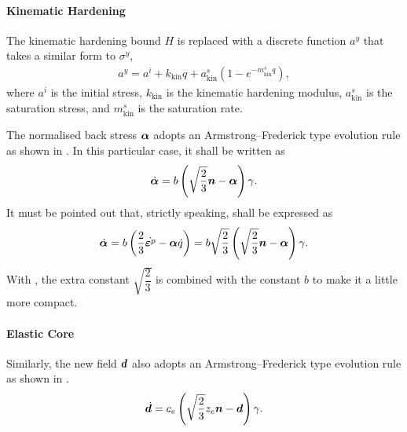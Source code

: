 \paragraph{Kinematic Hardening}
The kinematic hardening bound $H$ is replaced with a discrete function $a^y$ that takes a similar form to $\sigma^y$,
\begin{gather}\label{eq:kin_bone}
    a^y=a^i+k_\text{kin}q+a^s_\text{kin}\left(1-e^{-m^s_\text{kin}q}\right),
\end{gather}
where $a^i$ is the initial stress, $k_\text{kin}$ is the kinematic hardening modulus, $a^s_\text{kin}$ is the saturation stress, and $m^s_\text{kin}$ is the saturation rate.

The normalised back stress $\bm{\alpha}$ adopts an Armstrong--Frederick type \cite{Frederick2007} evolution rule as shown in .
In this particular case, it shall be written as
\begin{gather}\label{eq:normalised_back_rule}
    \dot{\bm{\alpha}}=b\left(\sqrt{\dfrac{2}{3}}\bm{n}-\bm{\alpha}\right)\gamma.
\end{gather}
It must be pointed out that, strictly speaking,  shall be expressed as \cite{Simo1998}
\begin{gather}
    \dot{\bm{\alpha}}=b\left(\dfrac{2}{3}\dot{\bm{\varepsilon}^p}-\bm{\alpha}\dot{q}\right)=b\sqrt{\dfrac{2}{3}}\left(\sqrt{\dfrac{2}{3}}\bm{n}-\bm{\alpha}\right)\gamma.
\end{gather}
With , the extra constant $\sqrt{\dfrac{2}{3}}$ is combined with the constant $b$ to make it a little more compact.
\paragraph{Elastic Core}
Similarly, the new field $\bm{d}$ also adopts an Armstrong--Frederick type evolution rule as shown in .
\begin{gather}
    \dot{\bm{d}}=c_e\left(\sqrt{\dfrac{2}{3}}z_e\bm{n}-\bm{d}\right)\gamma.
\end{gather}
